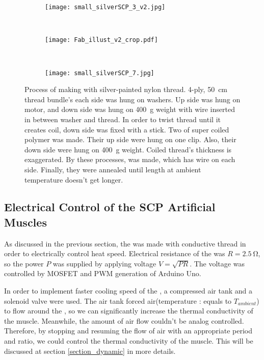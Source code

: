 \begin{figure}
	\centering
	\begin{subfigure}{.15\linewidth}
		\centering\texttt{[image: small\_silverSCP\_3\_v2.jpg]}
		\caption{\label{silverSCP_2}}
	\end{subfigure}
	~
	\begin{subfigure}{.45\linewidth}
		\centering\texttt{[image: Fab\_illust\_v2\_crop.pdf]}
		\caption{\label{silverSCP_illust}}
	\end{subfigure}
	~
	\begin{subfigure}{.15\linewidth}
		\centering\texttt{[image: small\_silverSCP\_7.jpg]}
		\caption{\label{silverSCP_annealing}}
	\end{subfigure}
	\caption[Process of making \scp with silver-painted nylon thread]{Process of making \scp with silver-painted nylon thread.   4-ply, \SI{50}{\centi\meter} thread bundle's each side was hung on washers. Up side was hung on motor, and down side was hung on \SI{400}{\gram} weight with wire inserted in between washer and thread.  In order to twist thread until it creates coil, down side was fixed with a stick. Two of super coiled polymer was made. Their up side were hung on one clip. Also, their down side were hung on \SI{400}{\gram} weight. Coiled thread's thickness is exaggerated.  By these processes, \scp was made, which has wire on each side. Finally, they were annealed until length at ambient temperature doesn't get longer.}
	\label{silverSCP_makingof}
\end{figure}

\subsection{Electrical Control of the SCP Artificial Muscles}\label{section_electrical_control}
As discussed in the previous section, the \scp was made with conductive thread in order to electrically control heat speed. Electrical resistance of the \scp was $R=\SI{2.5}{\ohm}$, so the power $P$ was supplied by applying voltage $V=\sqrt{PR}$. The voltage was controlled by MOSFET and PWM generation of Arduino Uno.

In order to implement faster cooling speed of the \scp, a compressed air tank and a solenoid valve were used. The air tank forced air(temperature : equals to  $T_{ambient}$) to flow around the \scp, so we can significantly increase the thermal conductivity of the muscle. Meanwhile, the amount of air flow couldn't be analog controlled. Therefore, by stopping and resuming the flow of air with an appropriate period and ratio, we could control the thermal conductivity of the muscle. This will be discussed at section \ref{section_dynamic} in more details.


